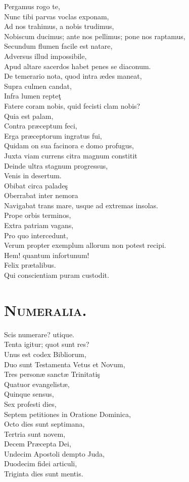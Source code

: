 \documentclass[12pt, twocolumn]{memoir}
\begin{document}
Pergamus rogo te,\\
Nunc tibi parvas voclas exponam,\\
Ad nos trahimus, a nobis trudimus,\\
Nobiscum ducimus; ante nos pellimus; pone nos raptamus,\\
Secundum flumen facile est natare,\\
Adversus illud impossibile,\\
Apud altare sacerdos habet penes se diaconum.\\
De temerario nota, quod intra ædes maneat,\\
Supra culmen candat,\\
Infra lumen repteţ\\
Fatere coram nobis, quid fecisti clam nobis?\\
Quia est palam,\\
Contra præceptum feci,\\
Erga præceptorum ingratus fui,\\
Quidam on sua facinora e domo profugus,\\
Juxta viam currens citra magnum constitit\\
Deinde ultra stagnum progressus,\\
Venis in desertum.\\
Obibat circa paladeş\\
Oberrabat inter nemora\\
Navigabat trans mare, usque ad extremas insolas.\\
Prope orbis terminos,\\
Extra patriam vagans,\\
Pro quo intercedunt,\\
Verum propter exemplum allorum non potest recipi.\\
Hem! quantum infortunum!\\
Felix prætalibus.\\
Qui conscientiam puram custodit.\\

\section*{\textsc{Numeralia.}}

Scis numerare? utique.\\
Tenta igitur; quot sunt res?\\
Unus est codex Bibliorum,\\
Duo sunt Testamenta Vetus et Novum,\\
Tres personæ sanctæ Trinitatiş\\
Quatuor evangelistæ,\\
Quinque sensus,\\
Sex profesti dies,\\
Septem petitiones in Oratione Dominica,\\
Octo dies sunt septimana,\\
Tertria sunt novem,\\
Decem Præcepta Dei,\\
Undecim Apostoli dempto Juda,\\
Duodecim fidei articuli,\\
Triginta dies sunt mentis.\\
\end{document}
